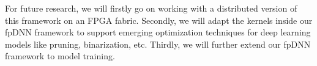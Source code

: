 \documentclass{acm_proc_article-sp-copy}
\begin{document}
For future research, we will firstly go on working with a distributed version of this framework on an FPGA fabric. Secondly, we will adapt the kernels inside our fpDNN framework to support emerging optimization techniques for deep learning models like pruning, binarization, etc. Thirdly, we will further extend our fpDNN framework to model training.



%
\scriptsize

%
%

\end{document}
